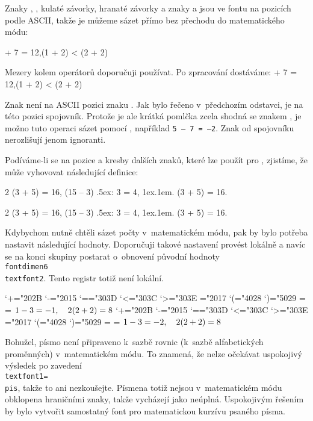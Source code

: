 Znaky , , kulaté závorky, hranaté závorky a znaky
 a  jsou ve fontu na pozicích podle ASCII, takže
je můžeme sázet přímo bez přechodu do matematického módu:

 + 7 = 12,\quad  (1 + 2) < (2 + 2)
\endtt

Mezery kolem operátorů doporučuji používat. Po zpracování dostáváme:
\bigskip
{ + 7 = 12,\quad  (1 + 2) < (2 + 2)}
\bigskip

Znak  není na ASCII pozici znaku \uv{{\tt-}}. Jak bylo řečeno
v~předchozím odstavci, je na této pozici spojovník. Protože je ale
krátká pomlčka zcela shodná se znakem , je možno tuto operaci
sázet pomocí \uv{{\tt--}}, například \hbox{\tt 5 -- 7 = --2}.
Znak  od spojovníku nerozlišují jenom ignoranti.

Podíváme-li se na pozice a kresby dalších znaků, které lze použít pro
, zjistíme, že může vyhovovat následující definice:

\begtt
\chardef{}
\def\.{\raise1ex\hbox{\kern.1em.}}  \def\:{\raise.5ex\hbox{:}}
2 \* (3 + 5) = 16, \quad (15 -- 3) \: 3 = 4,  \. (3 + 5) = 16.
\endtt

{\slabikar
\chardef{}
\def\.{\raise1ex\hbox{\kern.1em.}}  \def\:{\raise.5ex\hbox{:}}
2 \* (3 + 5) = 16, \quad (15 -- 3) \: 3 = 4,  \. (3 + 5) = 16.
}
\bigskip

Kdybychom nutně chtěli sázet počty v~matematickém módu, pak by bylo potřeba
nastavit následující hodnoty. Doporučuji takové nastavení provést lokálně a
navíc se na konci skupiny postarat o~obnovení původní hodnoty
{\tt\\fontdimen6\\textfont2}. Tento registr totiž není lokální.

\begtt
\mathcode`+="202B     \mathcode`-="2015
\mathcode`=="303D     \mathcode`<="303C    \mathcode`>="303E
\mathchardef\*="2017  \def\:{\mathop{\raise.5ex\hbox{\pis:}}}
\def\.{\mathop{\raise1ex\hbox{\pis\kern.1em.}}} \let\cdot=\.
\mathcode`(="4028     \mathcode`)="5029
=\pis
{}=
$ 1-3=-1,  \quad   2\*(2+2)=8 $
\endtt
{\slabikar
\mathcode`+="202B     \mathcode`-="2015
\mathcode`=="303D     \mathcode`<="303C    \mathcode`>="303E
\mathchardef\*="2017  \def\:{\mathop{\raise.5ex\hbox{:}}}
\mathcode`(="4028     \mathcode`)="5029
=\pis
{}=
$ 1-3=-2,  \quad   2\*(2+2)=8 $
}
\bigskip

Bohužel, písmo není připraveno k~sazbě rovnic (k~sazbě alfabetických
proměnných) v~matematickém módu. To znamená, že nelze očekávat uspokojivý
výsledek po zavedení {\tt\\textfont1=\\pis}, takže to ani nezkoušejte.
Písmena totiž nejsou v~matematickém módu obklopena hraničními znaky, takže
vycházejí jako neúplná. Uspokojivým řešením by bylo vytvořit samostatný
font pro matematickou kurzívu psaného písma.

